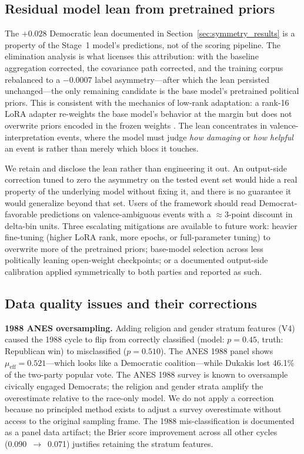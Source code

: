 \documentclass[12pt, letterpaper]{article}
\theoremstyle{definition}
\newcommand{\mueff}{\mu_{\mathrm{eff}}}
\begin{document}
\subsection{Residual model lean from pretrained priors}
\label{sec:model_lean}

The $+0.028$ Democratic lean documented in Section~\ref{sec:symmetry_results}
is a property of the Stage~1 model's predictions, not of the scoring pipeline.
The elimination analysis is what licenses this attribution: with the baseline
aggregation corrected, the covariance path corrected, and the training corpus
rebalanced to a $-0.0007$ label asymmetry---after which the lean persisted
unchanged---the only remaining candidate is the base model's pretrained
political priors. This is consistent with the mechanics of low-rank
adaptation: a rank-16 LoRA adapter re-weights the base model's behavior at the
margin but does not overwrite priors encoded in the frozen weights
\citep{Hu2022}. The lean concentrates in valence-interpretation events, where
the model must judge \emph{how damaging} or \emph{how helpful} an event is
rather than merely which blocs it touches.

We retain and disclose the lean rather than engineering it out. An output-side
correction tuned to zero the asymmetry on the tested event set would hide a
real property of the underlying model without fixing it, and there is no
guarantee it would generalize beyond that set. Users of the framework should
read Democrat-favorable predictions on valence-ambiguous events with a
$\approx 3$-point discount in delta-bin units. Three escalating mitigations
are available to future work: heavier fine-tuning (higher LoRA rank, more
epochs, or full-parameter tuning) to overwrite more of the pretrained priors;
base-model selection across less politically leaning open-weight checkpoints;
or a documented output-side calibration applied symmetrically to both parties
and reported as such.

\subsection{Data quality issues and their corrections}
\label{sec:1988}

\textbf{1988 ANES oversampling.} Adding religion and gender stratum features
(V4) caused the 1988 cycle to flip from correctly classified (model:
$p = 0.45$, truth: Republican win) to misclassified ($p = 0.510$). The
ANES 1988 panel shows $\mueff = 0.521$---which looks like a Democratic
coalition---while Dukakis lost 46.1\% of the two-party popular vote. The
ANES 1988 survey is known to oversample civically engaged Democrats; the
religion and gender strata amplify the overestimate relative to the
race-only model. We do not apply a correction because no principled method
exists to adjust a survey overestimate without access to the original
sampling frame. The 1988 mis-classification is documented as a panel
data artifact; the Brier score improvement across all other cycles
(0.090~$\to$~0.071) justifies retaining the stratum features.
\end{document}
